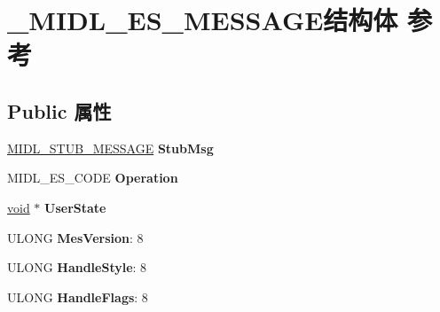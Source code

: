 \hypertarget{struct___m_i_d_l___e_s___m_e_s_s_a_g_e}{}\section{\+\_\+\+M\+I\+D\+L\+\_\+\+E\+S\+\_\+\+M\+E\+S\+S\+A\+G\+E结构体 参考}
\label{struct___m_i_d_l___e_s___m_e_s_s_a_g_e}
\subsection*{Public 属性}
\begin{DoxyCompactItemize}
\item 
\mbox{\label{struct___m_i_d_l___e_s___m_e_s_s_a_g_e_a0884a147be02c5b0b476f6004a9a6d76}} 
\hyperlink{struct___m_i_d_l___s_t_u_b___m_e_s_s_a_g_e}{M\+I\+D\+L\+\_\+\+S\+T\+U\+B\+\_\+\+M\+E\+S\+S\+A\+GE} {\bfseries Stub\+Msg}
\item 
\mbox{\label{struct___m_i_d_l___e_s___m_e_s_s_a_g_e_a963e056e00c24b4ea40f94c315ff9645}} 
M\+I\+D\+L\+\_\+\+E\+S\+\_\+\+C\+O\+DE {\bfseries Operation}
\item 
\mbox{\label{struct___m_i_d_l___e_s___m_e_s_s_a_g_e_a0ff033424e23616a6597872eeb856240}} 
\hyperlink{interfacevoid}{void} $\ast$ {\bfseries User\+State}
\item 
\mbox{\label{struct___m_i_d_l___e_s___m_e_s_s_a_g_e_ac084b99a6ccf70ef1cc822888260c9be}} 
U\+L\+O\+NG {\bfseries Mes\+Version}\+: 8
\item 
\mbox{\label{struct___m_i_d_l___e_s___m_e_s_s_a_g_e_a1b55eeb582bb45180d14ee332dc2dabc}} 
U\+L\+O\+NG {\bfseries Handle\+Style}\+: 8
\item 
\mbox{\label{struct___m_i_d_l___e_s___m_e_s_s_a_g_e_a6c71362c3527679dcdab41b38525560e}} 
U\+L\+O\+NG {\bfseries Handle\+Flags}\+: 8
\item 
\mbox{\label{struct___m_i_d_l___e_s___m_e_s_s_a_g_e_a4e6d1e6d11d0395d17246791c44a41c4}} 

\end{DoxyCompactItemize}
